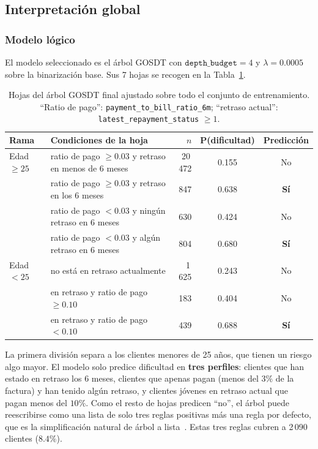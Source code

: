 \documentclass[a4paper,11pt]{article}
\begin{document}
\subsection{Interpretación global}
\label{sec:global}

\subsubsection{Modelo lógico}
El modelo seleccionado es el árbol GOSDT con $\texttt{depth\_budget}=4$ y $\lambda=0.0005$ sobre la binarización base. Sus 7 hojas se recogen en la Tabla~\ref{tab:gosdt_hojas}.

\begin{table}[H]
\centering
\small
\begin{tabular}{@{}llrcc@{}}
\toprule
Rama & Condiciones de la hoja & $n$ & P(dificultad) & Predicción \\
\midrule
Edad $\geq 25$ & ratio de pago $\geq 0.03$ y retraso en menos de 6 meses & 20\,472 & 0.155 & No \\
 & ratio de pago $\geq 0.03$ y retraso en los 6 meses & 847 & 0.638 & \textbf{Sí} \\
 & ratio de pago $< 0.03$ y ningún retraso en 6 meses & 630 & 0.424 & No \\
 & ratio de pago $< 0.03$ y algún retraso en 6 meses & 804 & 0.680 & \textbf{Sí} \\
\midrule
Edad $< 25$ & no está en retraso actualmente & 1\,625 & 0.243 & No \\
 & en retraso y ratio de pago $\geq 0.10$ & 183 & 0.404 & No \\
 & en retraso y ratio de pago $< 0.10$ & 439 & 0.688 & \textbf{Sí} \\
\bottomrule
\end{tabular}
\caption{Hojas del árbol GOSDT final ajustado sobre todo el conjunto de entrenamiento. ``Ratio de pago'': \texttt{payment\_to\_bill\_ratio\_6m}; ``retraso actual'': \texttt{latest\_repayment\_status} $\geq 1$.}
\label{tab:gosdt_hojas}
\end{table}

La primera división separa a los clientes menores de 25 años, que tienen un riesgo algo mayor. El modelo solo predice dificultad en \textbf{tres perfiles}: clientes que han estado en retraso los 6 meses, clientes que apenas pagan (menos del $3\%$ de la factura) y han tenido algún retraso, y clientes jóvenes en retraso actual que pagan menos del $10\%$. Como el resto de hojas predicen ``no'', el árbol puede reescribirse como una lista de solo tres reglas positivas más una regla por defecto, que es la simplificación natural de árbol a lista~\cite{slidesLogical}. Estas tres reglas cubren a 2\,090 clientes ($8.4\%$).
\end{document}
